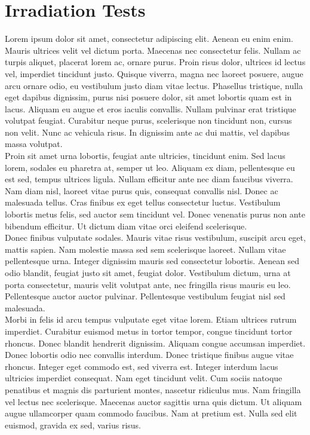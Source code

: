 \chapter{Irradiation Tests}
\label{chap:II-6-irradiation}

Lorem ipsum dolor sit amet, consectetur adipiscing elit. Aenean eu enim enim. Mauris ultrices velit vel dictum porta. Maecenas nec consectetur felis. Nullam ac turpis aliquet, placerat lorem ac, ornare purus. Proin risus dolor, ultrices id lectus vel, imperdiet tincidunt justo. Quisque viverra, magna nec laoreet posuere, augue arcu ornare odio, eu vestibulum justo diam vitae lectus. Phasellus tristique, nulla eget dapibus dignissim, purus nisi posuere dolor, sit amet lobortis quam est in lacus. Aliquam eu augue et eros iaculis convallis. Nullam pulvinar erat tristique volutpat feugiat. Curabitur neque purus, scelerisque non tincidunt non, cursus non velit. Nunc ac vehicula risus. In dignissim ante ac dui mattis, vel dapibus massa volutpat. \\

Proin sit amet urna lobortis, feugiat ante ultricies, tincidunt enim. Sed lacus lorem, sodales eu pharetra at, semper ut leo. Aliquam ex diam, pellentesque eu est sed, tempus ultrices ligula. Nullam efficitur ante nec diam faucibus viverra. Nam diam nisl, laoreet vitae purus quis, consequat convallis nisl. Donec ac malesuada tellus. Cras finibus ex eget tellus consectetur luctus. Vestibulum lobortis metus felis, sed auctor sem tincidunt vel. Donec venenatis purus non ante bibendum efficitur. Ut dictum diam vitae orci eleifend scelerisque. \\

Donec finibus vulputate sodales. Mauris vitae risus vestibulum, suscipit arcu eget, mattis sapien. Nam molestie massa sed sem scelerisque laoreet. Nullam vitae pellentesque urna. Integer dignissim mauris sed consectetur lobortis. Aenean sed odio blandit, feugiat justo sit amet, feugiat dolor. Vestibulum dictum, urna at porta consectetur, mauris velit volutpat ante, nec fringilla risus mauris eu leo. Pellentesque auctor auctor pulvinar. Pellentesque vestibulum feugiat nisl sed malesuada. \\

Morbi in felis id arcu tempus vulputate eget vitae lorem. Etiam ultrices rutrum imperdiet. Curabitur euismod metus in tortor tempor, congue tincidunt tortor rhoncus. Donec blandit hendrerit dignissim. Aliquam congue accumsan imperdiet. Donec lobortis odio nec convallis interdum. Donec tristique finibus augue vitae rhoncus. Integer eget commodo est, sed viverra est. Integer interdum lacus ultricies imperdiet consequat. Nam eget tincidunt velit. Cum sociis natoque penatibus et magnis dis parturient montes, nascetur ridiculus mus. Nam fringilla vel lectus nec scelerisque. Maecenas auctor sagittis urna quis dictum. Ut aliquam augue ullamcorper quam commodo faucibus. Nam at pretium est. Nulla sed elit euismod, gravida ex sed, varius risus. \\

